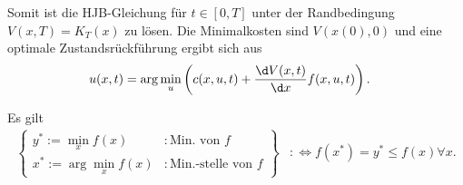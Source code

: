 Somit ist die \ac{HJB}-Gleichung für $t\in[0,T]$ unter der Randbedingung $V(x,T)=K_T(x)$ zu lösen. Die Minimalkosten sind $V(x(0),0)$ und eine optimale Zustandsrückführung ergibt sich
aus
\begin{align}
	u(x,t) & = \arg\min\limits_u\left(c(x,u,t) + \frac{\d V(x,t)}{\d x}f(x,u,t) \right).
\end{align}
\begin{remark}
Es gilt
\begin{align*}
	\left\{ \begin{array}{ll}
	y^{\ast}:=\min\limits_x f(x)	& : \text{Min. von }f\\
	x^{\ast}:=\arg\min\limits_x f(x)& : \text{Min.-stelle von }f
	\end{array}\right\} & :\Leftrightarrow f\left(x^{\ast}\right) = y^{\ast} \leq f(x) \forall x.
\end{align*}
\end{remark}

